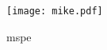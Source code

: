 \begin{figure}[H]
\begin{center}
\texttt{[image: mike.pdf]}
\caption{mspe}
\label{fig:mspe}
\end{center}
\end{figure}
